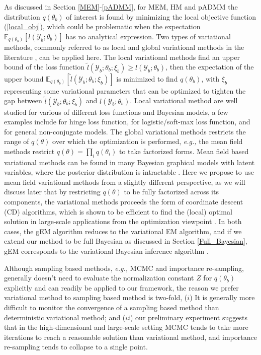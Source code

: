 \documentclass{article}
\newcommand{\eg}[0]{\emph{e.g., }}
\newcommand{\1}[0]{\ensuremath{\boldsymbol{1}}\xspace}
\begin{document}
As discussed in Section \ref{MEM}-\ref{pADMM}, for MEM, HM and pADMM the distribution $q(\theta_b)$ of interest is found by minimizing the local objective function (\ref{local_obj}), which could be problematic when the expectation $\mathbb{E}_{q(\theta_b)}[l(\mathcal{Y}_b; \theta_b)]$ has no analytical expression. Two types of variational methods, commonly referred to as local and global variational methods in the literature \cite{Bishop2006}, can be applied here. The local variational methods find an upper bound of the loss function $\tilde l(\mathcal{Y}_b; \theta_b; \xi_b) \ge  l(\mathcal{Y}_b; \theta_b)$, then the expectation of the upper bound $\mathbb{E}_{q(\theta_b)}[\tilde l(\mathcal{Y}_b; \theta_b; \xi_b)]$ is minimized to find $q(\theta_b)$, with $\xi_b$ representing some variational parameters that can be optimized to tighten the gap between $\tilde l(\mathcal{Y}_b; \theta_b; \xi_b)$ and $l(\mathcal{Y}_b; \theta_b)$. Local variational method are well studied for various of different loss functions and Bayesian models, a few examples include \cite{Zhu2012} for hinge loss function, \cite{Jaakkola2000, Khan2010} for logistic/soft-max loss function, and \cite{Khan2013, Wang2013} for general non-conjugate models. The global variational methods restricts the range of $q(\theta)$ over which the optimization is performed, \eg the mean field methods restrict $q(\theta) = \prod_iq(\theta_i)$ to take factorized forms. Mean field based variational methods can be found in many Bayesian graphical models with latent variables, where the posterior distribution is intractable \cite{Wainwright2008}. Here we propose to use mean field variational methods from a slightly different perspective, as we will discuss later that by restricting $q(\theta)$ to be fully factorized across its components, the variational methods proceeds the form of coordinate descent (CD) algorithms, which is shown to be efficient to find the (local) optimal solution in large-scale applications from the optimization viewpoint \cite{Friedman2010, Bradley2011, Yuan2012, Yu2013}. In both cases, the gEM algorithm reduces to the variational EM algorithm, and if we extend our method to be full Bayesian as discussed in Section \ref{Full_Bayesian}, gEM corresponds to the variational Bayesian inference algorithm \cite{Bishop2006, Wainwright2008}.

Although sampling based methods, \eg MCMC and importance re-sampling, generally doesn't need to evaluate the normalization constant $Z$ for $q(\theta_b)$ explicitly and can readily be applied to our framework, the reason we prefer variational method to sampling based method is two-fold, ($i$) It is generally more difficult to monitor the convergence of a sampling based method than deterministic variational method;  and ($ii$) our preliminary experiment suggests that in the high-dimensional and large-scale setting MCMC tends to take more iterations to reach a reasonable solution than variational method, and importance re-sampling tends to collapse to a single point.
\end{document}
